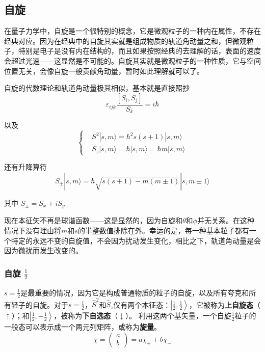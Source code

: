 \documentclass[UTF8]{ctexart}
\begin{document}
    \subsection{自旋}
    在量子力学中，自旋是一个很特别的概念，它是微观粒子的一种内在属性，不存在经典对应。因为在经典中的自旋其实就是组成物质的轨道角动量之和，但微观粒子，特别是电子是没有内在结构的，而且如果按照经典的去理解的话，表面的速度会超过光速——这显然是不可能的。自旋其实就是微观粒子的一种性质，它与空间位置无关，会像自旋一般贡献角动量，暂时如此理解就可以了。

    自旋的代数理论和轨道角动量极其相似，基本就是直接照抄
    \begin{equation}
        \varepsilon_{ijk} \frac{[S_i,S_j]}{S_k} = i \hbar 
    \end{equation}

\noindent 以及
\begin{equation}
    \left \{ \begin{aligned}
        &S^2 | s,m \rangle =\hbar^2 s (s+1) | s , m \rangle \\
        &S_z | s,m \rangle = \hbar | s, m \rangle = \hbar m |s , m \rangle
    \end{aligned} \right.
\end{equation}

\noindent 还有升降算符
\begin{equation}
    S_{\pm} |s,m \rangle = \hbar \sqrt{s(s+1) - m(m \pm 1)} | s , m \pm 1 \rangle
\end{equation}

\noindent 其中 $S_{\pm} = S_x + i S_y$

    现在本征矢不再是球谐函数——这是显然的，因为自旋和$\theta$和$\phi$并无关系。在这种情况下没有理由将$m$和$s$的半整数值排除在外。幸运的是，每一种基本粒子都有一个特定的永远不变的自旋值，不会因为扰动发生变化，相比之下，轨道角动量是会因为微扰而发生改变的。

    \subsubsection{自旋 \texorpdfstring{$\frac{1}{2}$}{Lg}}
    $s = \frac{1}{2}$是最重要的情况，因为它是构成普通物质的粒子的自旋，以及所有夸克和所有轻子的自旋。对于$s= \frac{1}{2}$，$\hat{S}^2$和$\hat{S}_z$仅有两个本征态：$\left| \frac{1}{2}, \frac{1}{2}  \right\rangle$，它被称为\textbf{上自旋态}（$\uparrow$）；和$\left| \frac{1}{2}, -\frac{1}{2}  \right\rangle$，被称为\textbf{下自选态}（$\downarrow$）。 利用这两个基矢量，一个自旋$\frac{1}{2}$粒子的一般态可以表示成一个两元列矩阵，或称为\textbf{旋量}。
    \begin{equation}
    \chi=\left(\begin{array}{l}{a} \\ {b}\end{array}\right)=a \chi_{+}+b \chi_{-}
    \end{equation}
\end{document}
